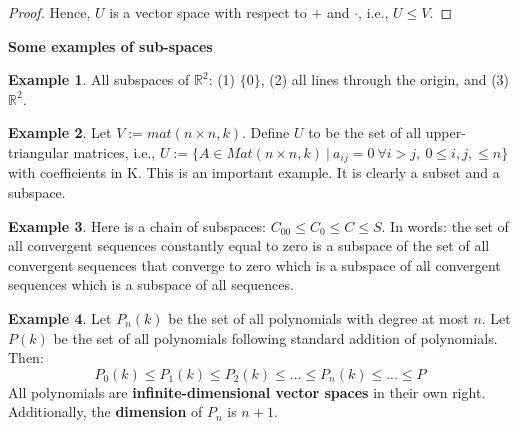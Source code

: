 \documentclass[a4paper, 12pt]{article}
\theoremstyle{definition}
\newtheorem{exmp}{Example}[section]
\theoremstyle{definition}
\theoremstyle{definition}
\theoremstyle{definition}
\begin{document}
{\begin{proof}
	Hence, $U$ is a vector space with respect to $+$ and $\cdot$, i.e., $U \leq V$. 
\end{proof}

\textbf{Some examples of sub-spaces}

\begin{exmp}
	All subspaces of $\mathbb{R}^2$: (1) $\{ 0 \}$, (2) all lines through the origin, and (3) $\mathbb{R}^2$. 
\end{exmp}
\begin{exmp}
	Let $V:= mat(n \times n, k)$. Define $U$ to be the set of all upper-triangular matrices, i.e., $U := \{ A \in Mat(n \times n, k)\ |\ a_{ij} = 0\ \forall i > j,\ 0 \leq i,j, \leq n  \}$ with coefficients in K. This is an important example. It is clearly a subset and a subspace. 
\end{exmp}

\begin{exmp}
	Here is a chain of subspaces: $C_{00} \leq C_{0} \leq C \leq S$. In words: the set of all convergent sequences constantly equal to zero is a subspace of the set of all convergent sequences that converge to zero which is a subspace of all convergent sequences which is a subspace of all sequences. 
\end{exmp}

\begin{exmp}
	Let $P_n (k)$ be the set of all polynomials with degree at most $n$. Let $P(k)$ be the set of all polynomials following standard addition of polynomials. Then: 
	$$
		P_0(k) \leq P_1(k) \leq P_2(k) \leq ... \leq P_n(k) \leq ... \leq P
	$$
	All polynomials are \textbf{infinite-dimensional vector spaces} in their own right. Additionally, the \textbf{dimension} of $P_n$ is $n+1$. 
\end{exmp}

}
\end{document}
